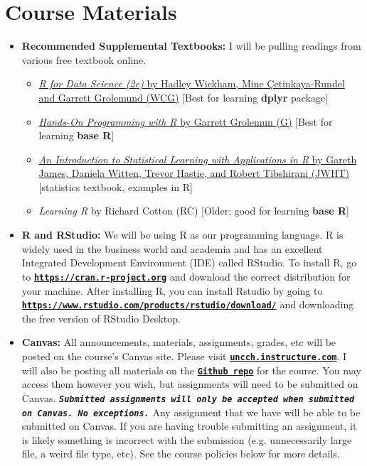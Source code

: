 \documentclass[11pt]{article}
\begin{document}
\section*{Course Materials}

\begin{itemize}

    \item \textbf{Recommended Supplemental Textbooks:} 
    I will be pulling readings from various free textbook online. 
    \begin{itemize}
        \item \href{https://r4ds.hadley.nz/}{\textit{R for Data Science (2e)} by Hadley Wickham, Mine \c{C}etinkaya-Rundel and Garrett Grolemund (WCG)} [Best for learning \textbf{dplyr} package]
        \item \href{https://rstudio-education.github.io/hopr/}{\textit{Hands-On Programming with R} by Garrett Grolemun (G)} [Best for learning \textbf{base R}]
        \item \href{https://web.stanford.edu/~hastie/ISLRv2_website.pdf}{\textit{An Introduction to Statistical Learning with Applications in R} by Gareth James, Daniela Witten, Trevor Hastie, and Robert Tibshirani (JWHT)} [statistics textbook, examples in R]
        \item \textit{Learning R} by Richard Cotton (RC) [Older; good for learning \textbf{base R}]
    \end{itemize}
    
    \item \textbf{R and RStudio:} We will be using R as our programming language. R is widely used in the business world and academia and has an excellent Integrated Development Environment (IDE) called RStudio. To install R, go to \href{https://cran.r-project.org}{\tt\bf https://cran.r-project.org} and download the correct distribution for your machine. After installing R, you can install Rstudio by going to \href{https://www.rstudio.com/products/rstudio/download/}{\tt\bf https://www.rstudio.com/products/rstudio/download/} and downloading the free version of RStudio Desktop.
    
    \item \textbf{Canvas:} All announcements, materials, assignments, grades, etc will be posted on the course's Canvas site. Please visit \href{https://uncch.instructure.com/}{\tt\bf uncch.instructure.com}. I will also be posting all materials on the \href{https://github.com/drewvankuiken/ECON370}{\tt\bf Github repo} for the course. You may access them however you wish, but assignments will need to be submitted on Canvas. {\tt\bf  \emph{Submitted assignments will only be accepted when submitted on Canvas. No exceptions.}} Any assignment that we have will be able to be submitted on Canvas. If you are having trouble submitting an assignment, it is likely something is incorrect with the submission (e.g. unnecessarily large file, a weird file type, etc). See the course policies below for more details.
\end{itemize}
\end{document}
